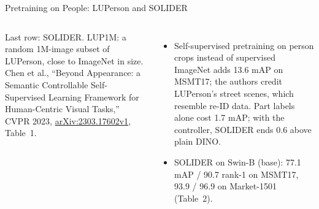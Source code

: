 \begin{frame}{Pretraining on People: LUPerson and SOLIDER}
\begin{columns}[T,onlytextwidth]
      \vspace{0.2em}
      {\scriptsize Last row: SOLIDER. LUP1M: a random 1M-image subset of LUPerson, close to ImageNet in size. Chen et al., ``Beyond Appearance: a Semantic Controllable Self-Supervised Learning Framework for Human-Centric Visual Tasks,'' CVPR 2023, \href{https://arxiv.org/abs/2303.17602v1}{arXiv:2303.17602v1}, Table~1.\par}
      \begin{itemize}\scriptsize\itemsep0.2em
        \item Self-supervised pretraining on person crops instead of supervised ImageNet adds 13.6 mAP on MSMT17; the authors credit LUPerson's street scenes, which resemble re-ID data. Part labels alone cost 1.7 mAP; with the controller, SOLIDER ends 0.6 above plain DINO.
        \item SOLIDER on Swin-B (base): 77.1 mAP / 90.7 rank-1 on MSMT17, 93.9 / 96.9 on Market-1501 (Table~2).
      \end{itemize}
  \end{columns}
\end{frame}

